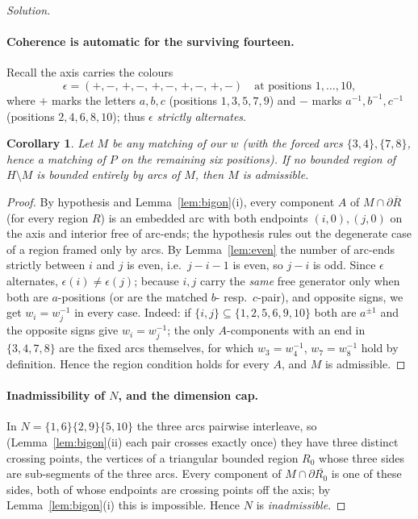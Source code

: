 \documentclass{amsart}
\newtheorem{corollary}{Corollary}
\theoremstyle{definition}
\newcommand{\bdy}{\partial}
\begin{document}
\begin{proof}[Solution]
\paragraph{Coherence is automatic for the surviving fourteen.}
Recall the axis carries the colours
\[
  \epsilon=(+,-,\,+,-,\,+,-,\,+,-,\,+,-)\quad\text{at positions }1,\dots,10,
\]
where $+$ marks the letters $a,b,c$ (positions $1,3,5,7,9$) and $-$ marks
$a^{-1},b^{-1},c^{-1}$ (positions $2,4,6,8,10$); thus $\epsilon$ \emph{strictly alternates}.

\begin{corollary}\label{cor:auto}
Let $M$ be any matching of our $w$ (with the forced arcs $\{3,4\},\{7,8\}$, hence a matching of
$P$ on the remaining six positions). If no bounded region of $H\setminus M$ is bounded entirely
by arcs of $M$, then $M$ is admissible.
\end{corollary}

\begin{proof}
By hypothesis and Lemma~\ref{lem:bigon}(i), every component $A$ of $M\cap\bdy\overline R$ (for
every region $R$) is an embedded arc with both endpoints $(i,0),(j,0)$ on the axis and interior
free of arc-ends; the hypothesis rules out the degenerate case of a region framed only by arcs.
By Lemma~\ref{lem:even} the number of arc-ends strictly between $i$ and $j$ is even, i.e.\
$j-i-1$ is even, so $j-i$ is odd. Since $\epsilon$ alternates, $\epsilon(i)\ne\epsilon(j)$;
because $i,j$ carry the \emph{same} free generator only when both are $a$-positions (or are the
matched $b$- resp.\ $c$-pair), and opposite signs, we get $w_i=w_j^{-1}$ in every case. Indeed:
if $\{i,j\}\subseteq\{1,2,5,6,9,10\}$ both are $a^{\pm1}$ and the opposite signs give
$w_i=w_j^{-1}$; the only $A$-components with an end in $\{3,4,7,8\}$ are the fixed arcs
themselves, for which $w_3=w_4^{-1}$, $w_7=w_8^{-1}$ hold by definition. Hence the region
condition holds for every $A$, and $M$ is admissible.
\end{proof}

\paragraph{Inadmissibility of $N$, and the dimension cap.}
In $N=\{1,6\}\{2,9\}\{5,10\}$ the three arcs pairwise interleave, so (Lemma~\ref{lem:bigon}(ii)
each pair crosses exactly once) they have three distinct crossing points, the vertices of a
triangular bounded region $R_0$ whose three sides are sub-segments of the three arcs. Every
component of $M\cap\bdy\overline{R_0}$ is one of these sides, both of whose endpoints are
crossing points off the axis; by Lemma~\ref{lem:bigon}(i) this is impossible. Hence $N$ is
\emph{inadmissible}.


\end{proof}
\end{document}
